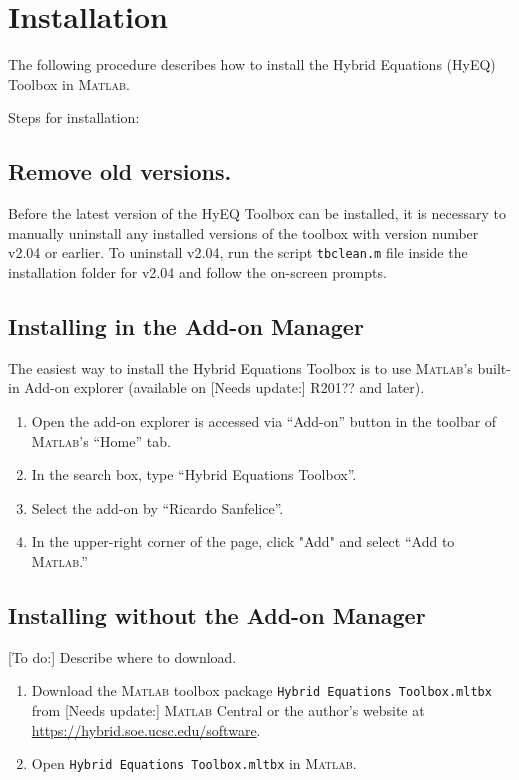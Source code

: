 \documentclass{article}
\newcommand{\matlab}{\textsc{Matlab}}
\newcommand{\needsupdate}[1]{{\color{red} [Needs update:] #1}}
\newcommand{\todo}[1]{{\color{red} [To do:] #1}}
\begin{document}
\section{Installation}
\label{sec:installation}

The following procedure describes how to install 
the Hybrid Equations (HyEQ) Toolbox in \matlab. 

Steps for installation:

\subsection{Remove old versions.}
  Before the latest version of the HyEQ Toolbox can be installed, 
  it is necessary to manually uninstall any installed versions of the toolbox 
  with version number v2.04 or earlier. To uninstall v2.04,
  run the script {\tt tbclean.m} file inside the installation folder for v2.04 
  and follow the on-screen prompts.

\subsection{Installing in the Add-on Manager}
  The easiest way to install the Hybrid Equations Toolbox is to use \matlab{}'s built-in 
  Add-on explorer (available on \needsupdate{R201??} and later). 
  \begin{enumerate}
    \item Open the add-on explorer is accessed via ``Add-on'' button 
    in the toolbar of \matlab{}'s ``Home'' tab.
    \item In the search box, type ``Hybrid Equations Toolbox''.
    \item Select the add-on by ``Ricardo Sanfelice''.
    \item In the upper-right corner of the page, click "Add" and select ``Add to \matlab{}.''
  \end{enumerate}

\subsection{Installing without the Add-on Manager}
\todo{Describe where to download.}
\begin{enumerate}
  \item Download the \matlab{} toolbox package {\tt Hybrid Equations Toolbox.mltbx} 
  from \needsupdate{\matlab{} Central 
  or the author's website at \url{https://hybrid.soe.ucsc.edu/software}.}
  \item Open {\tt Hybrid Equations Toolbox.mltbx} in \matlab{}.
\end{enumerate}
\end{document}
